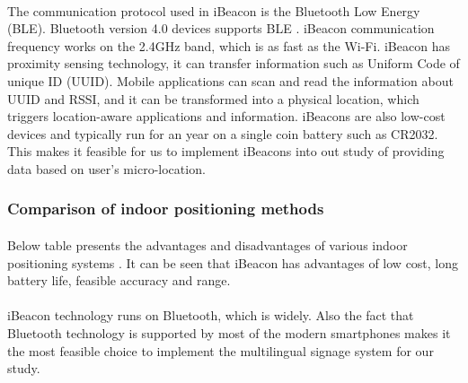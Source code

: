 \documentclass[12pt]{article}
\begin{document}
\paragraph{}The communication protocol used in iBeacon is the Bluetooth Low Energy (BLE). Bluetooth version 4.0 devices supports BLE \cite{indoor}. iBeacon communication frequency works on the 2.4GHz band, which is as fast as the Wi-Fi. iBeacon has proximity sensing technology, it can transfer information such as Uniform Code of unique ID (UUID). Mobile applications can scan and read the information about UUID and RSSI, and it can be transformed into a physical location, which triggers location-aware applications and information. iBeacons are also low-cost devices and typically run for an year on a single coin battery such as CR2032. \cite{audioBeacon} This makes it feasible for us to implement iBeacons into out study of providing data based on user's micro-location.

\subsubsection{Comparison of indoor positioning methods}
\paragraph{} Below table presents the advantages and disadvantages of various indoor positioning systems \cite{sensing}. It can be seen that iBeacon has advantages of low cost, long battery life, feasible accuracy and range. %

\paragraph{} iBeacon technology runs on Bluetooth, which is widely. Also the fact that Bluetooth technology is supported by most of the modern smartphones \cite{indoor} makes it the most feasible choice to implement the multilingual signage system for our study.
 
\end{document}
